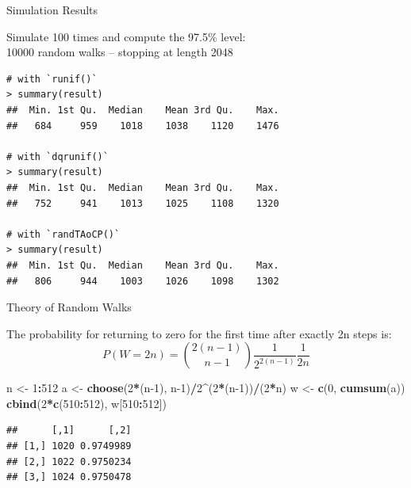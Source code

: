 \documentclass[ignorenonframetext,]{beamer}
\newenvironment{Shaded}{\begin{snugshade}}{\end{snugshade}}
\newcommand{\DecValTok}[1]{\textcolor[rgb]{0.00,0.00,0.81}{#1}}
\newcommand{\KeywordTok}[1]{\textcolor[rgb]{0.13,0.29,0.53}{\textbf{#1}}}
\newcommand{\NormalTok}[1]{#1}
\newcommand{\OperatorTok}[1]{\textcolor[rgb]{0.81,0.36,0.00}{\textbf{#1}}}
\newcommand{\StringTok}[1]{\textcolor[rgb]{0.31,0.60,0.02}{#1}}
\begin{document}
\begin{frame}[fragile]{Simulation Results}
\protect\hypertarget{simulation-results}{}

Simulate 100 times and compute the 97.5\% level:\\
10000 random walks -- stopping at length 2048

\begin{verbatim}
# with `runif()`
> summary(result)
##  Min. 1st Qu.  Median    Mean 3rd Qu.    Max.
##   684     959    1018    1038    1120    1476

# with `dqrunif()`
> summary(result)
##  Min. 1st Qu.  Median    Mean 3rd Qu.    Max.
##   752     941    1013    1025    1108    1320

# with `randTAoCP()`
> summary(result)
##  Min. 1st Qu.  Median    Mean 3rd Qu.    Max. 
##   806     944    1003    1026    1098    1302 
\end{verbatim}

\end{frame}

\begin{frame}[fragile]{Theory of Random Walks}
\protect\hypertarget{theory-of-random-walks}{}

The probability for returning to zero for the first time after exactly
2n steps is:
\[P(W = 2n) = {2(n-1) \choose n-1} \frac{1}{2^{2(n-1)}} \frac{1}{2n}\]

\begin{Shaded}
\begin{Highlighting}[]
\NormalTok{n <-}\StringTok{ }\DecValTok{1}\OperatorTok{:}\DecValTok{512}
\NormalTok{a <-}\StringTok{ }\KeywordTok{choose}\NormalTok{(}\DecValTok{2}\OperatorTok{*}\NormalTok{(n}\DecValTok{-1}\NormalTok{), n}\DecValTok{-1}\NormalTok{)}\OperatorTok{/}\DecValTok{2}\OperatorTok{^}\NormalTok{(}\DecValTok{2}\OperatorTok{*}\NormalTok{(n}\DecValTok{-1}\NormalTok{))}\OperatorTok{/}\NormalTok{(}\DecValTok{2}\OperatorTok{*}\NormalTok{n)}
\NormalTok{w <-}\StringTok{ }\KeywordTok{c}\NormalTok{(}\DecValTok{0}\NormalTok{, }\KeywordTok{cumsum}\NormalTok{(a))}
\KeywordTok{cbind}\NormalTok{(}\DecValTok{2}\OperatorTok{*}\KeywordTok{c}\NormalTok{(}\DecValTok{510}\OperatorTok{:}\DecValTok{512}\NormalTok{), w[}\DecValTok{510}\OperatorTok{:}\DecValTok{512}\NormalTok{])}
\end{Highlighting}
\end{Shaded}

\begin{verbatim}
##      [,1]      [,2]
## [1,] 1020 0.9749989
## [2,] 1022 0.9750234
## [3,] 1024 0.9750478
\end{verbatim}

\end{frame}
\end{document}
